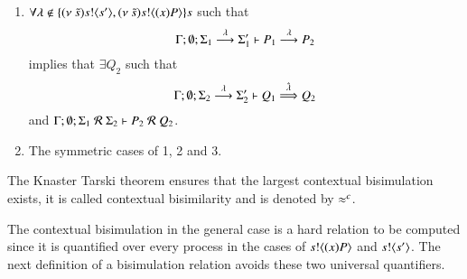 \begin{definition}
\begin{enumerate}
		\item	$\forall \lambda \notin \{(\nu\ \tilde{s}) s ! \langle s' \rangle, (\nu\ \tilde{s}) s ! \langle (x)P \rangle\}s$ such that
			\[
				\Gamma; \emptyset; \Sigma_1 \stackrel{\lambda}{\longrightarrow} \Sigma_1' \vdash P_1 \stackrel{\lambda}{\longrightarrow} P_2
			\]
			implies that $\exists Q_2$ such that 
			\[
				\Gamma; \emptyset; \Sigma_2 \stackrel{\lambda}{\longrightarrow} \Sigma_2' \vdash Q_1 \stackrel{\hat{\lambda}}{\Longrightarrow} Q_2
			\]
			and
			$\Gamma; \emptyset; \Sigma_1\ \mathcal{R}\ \Sigma_2 \proves P_2\ \mathcal{R}\ Q_2$.

		\item	The symmetric cases of 1, 2 and 3.
	\end{enumerate}
	The Knaster Tarski theorem ensures that the largest contextual bisimulation exists, it is called contextual bisimilarity and is denoted by $\approx^c$.
\end{definition}

The contextual bisimulation in the general case is a hard relation to be computed
since it is quantified over every process in the cases of 
$s ! \langle (x)P \rangle$ and $s ! \langle s' \rangle$. The next definition
of a bisimulation relation avoids these two universal quantifiers.


